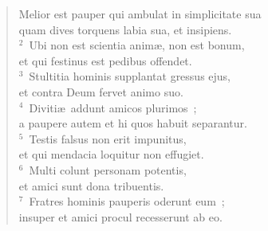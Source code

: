 \begin{flushleft}\begin{verse}\vspace{-19pt}\hspace{6pt}Melior est pauper qui ambulat in simplicitate sua\\\hspace{6pt} quam dives torquens labia sua, et insipiens.\\
${}^{2}$~Ubi non est scientia anim\ae , non est bonum,\\ et qui festinus est pedibus offendet.\\
${}^{3}$~Stultitia hominis supplantat gressus ejus,\\ et contra Deum fervet animo suo.\\
${}^{4}$~Diviti\ae\ addunt amicos plurimos~;\\ a paupere autem et hi quos habuit separantur.\\
${}^{5}$~Testis falsus non erit impunitus,\\ et qui mendacia loquitur non effugiet.\\
${}^{6}$~Multi colunt personam potentis,\\ et amici sunt dona tribuentis.\\
${}^{7}$~Fratres hominis pauperis oderunt eum~;\\ insuper et amici procul recesserunt ab eo.\end{verse}\end{flushleft}

